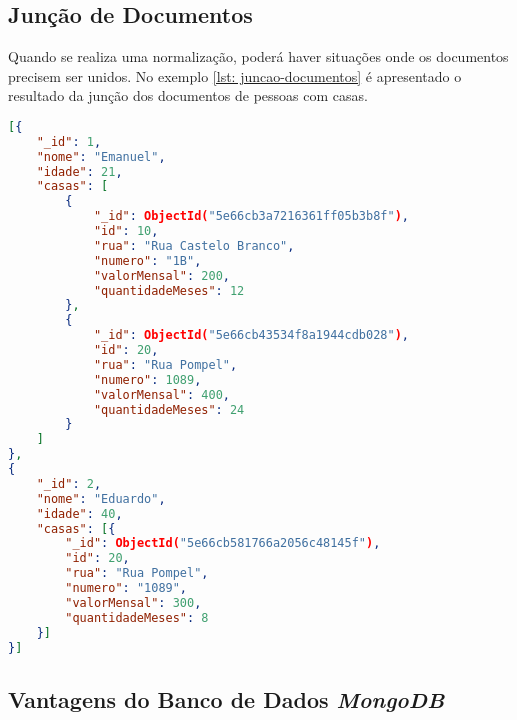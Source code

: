 \subsection{Junção de Documentos\label{subsection: juncao-documentos}}
    
Quando se realiza uma normalização, poderá haver situações onde os documentos precisem ser unidos. No exemplo \ref{lst: juncao-documentos} é apresentado o resultado da junção dos documentos de pessoas com casas.


\begin{lstlisting}[language=json, caption={Junção de Documentos Normalizados\label{lst: juncao-documentos}}]
[{
    "_id": 1,
    "nome": "Emanuel",
    "idade": 21,
    "casas": [
        {
            "_id": ObjectId("5e66cb3a7216361ff05b3b8f"),
            "id": 10,
            "rua": "Rua Castelo Branco",
            "numero": "1B",
            "valorMensal": 200,
            "quantidadeMeses": 12
        },
        {
            "_id": ObjectId("5e66cb43534f8a1944cdb028"),
            "id": 20,
            "rua": "Rua Pompel",
            "numero": 1089,
            "valorMensal": 400,
            "quantidadeMeses": 24
        }
    ]
},
{
    "_id": 2,
    "nome": "Eduardo",
    "idade": 40,
    "casas": [{
        "_id": ObjectId("5e66cb581766a2056c48145f"),
        "id": 20,
        "rua": "Rua Pompel",
        "numero": "1089",
        "valorMensal": 300,
        "quantidadeMeses": 8
    }]
}]
\end{lstlisting}


\subsection{Vantagens do Banco de Dados \textit{MongoDB}}

